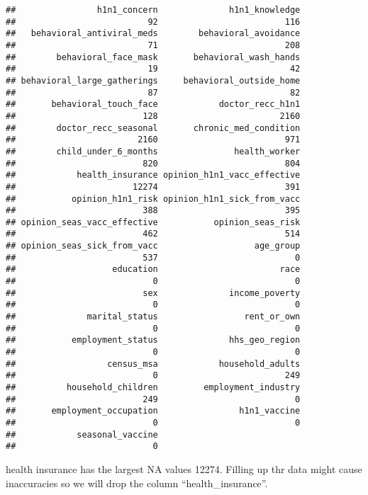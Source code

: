 \documentclass[
]{article}
\begin{document}
\begin{verbatim}
##                h1n1_concern              h1n1_knowledge 
##                          92                         116 
##   behavioral_antiviral_meds        behavioral_avoidance 
##                          71                         208 
##        behavioral_face_mask       behavioral_wash_hands 
##                          19                          42 
## behavioral_large_gatherings     behavioral_outside_home 
##                          87                          82 
##       behavioral_touch_face            doctor_recc_h1n1 
##                         128                        2160 
##        doctor_recc_seasonal       chronic_med_condition 
##                        2160                         971 
##        child_under_6_months               health_worker 
##                         820                         804 
##            health_insurance opinion_h1n1_vacc_effective 
##                       12274                         391 
##           opinion_h1n1_risk opinion_h1n1_sick_from_vacc 
##                         388                         395 
## opinion_seas_vacc_effective           opinion_seas_risk 
##                         462                         514 
## opinion_seas_sick_from_vacc                   age_group 
##                         537                           0 
##                   education                        race 
##                           0                           0 
##                         sex              income_poverty 
##                           0                           0 
##              marital_status                 rent_or_own 
##                           0                           0 
##           employment_status              hhs_geo_region 
##                           0                           0 
##                  census_msa            household_adults 
##                           0                         249 
##          household_children         employment_industry 
##                         249                           0 
##       employment_occupation                h1n1_vaccine 
##                           0                           0 
##            seasonal_vaccine 
##                           0
\end{verbatim}

health insurance has the largest NA values 12274. Filling up thr data
might cause inaccuracies so we will drop the column
``health\_insurance''.
\end{document}
